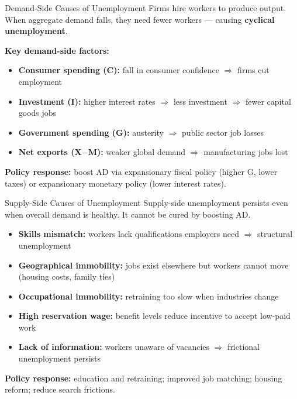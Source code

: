 \documentclass[16pt,aspectratio=169]{beamer}
\begin{document}
\begin{frame}{Demand-Side Causes of Unemployment}
    Firms hire workers to produce output. When aggregate demand falls, they need fewer workers --- causing \textbf{cyclical unemployment}.

    \vspace{0.4em}
    \textbf{Key demand-side factors:}
    \begin{itemize}\setlength\itemsep{0.25em}
        \item \textbf{Consumer spending (C):} fall in consumer confidence $\Rightarrow$ firms cut employment
        \item \textbf{Investment (I):} higher interest rates $\Rightarrow$ less investment $\Rightarrow$ fewer capital goods jobs
        \item \textbf{Government spending (G):} austerity $\Rightarrow$ public sector job losses
        \item \textbf{Net exports (X$-$M):} weaker global demand $\Rightarrow$ manufacturing jobs lost
    \end{itemize}

    \vspace{0.3em}
    \textbf{Policy response:} boost AD via expansionary fiscal policy (higher G, lower taxes) or expansionary monetary policy (lower interest rates).
\end{frame}

\begin{frame}{Supply-Side Causes of Unemployment}
    Supply-side unemployment persists even when overall demand is healthy. It cannot be cured by boosting AD.

    \vspace{0.3em}
    \begin{itemize}\setlength\itemsep{0.25em}
        \item \textbf{Skills mismatch:} workers lack qualifications employers need $\Rightarrow$ structural unemployment
        \item \textbf{Geographical immobility:} jobs exist elsewhere but workers cannot move (housing costs, family ties)
        \item \textbf{Occupational immobility:} retraining too slow when industries change
        \item \textbf{High reservation wage:} benefit levels reduce incentive to accept low-paid work
        \item \textbf{Lack of information:} workers unaware of vacancies $\Rightarrow$ frictional unemployment persists
    \end{itemize}

    \vspace{0.3em}
    \textbf{Policy response:} education and retraining; improved job matching; housing reform; reduce search frictions.
\end{frame}
\end{document}
